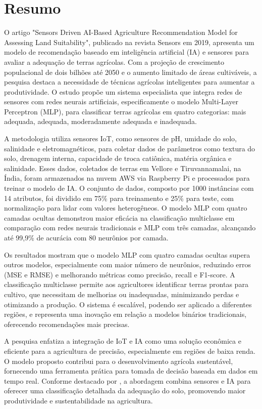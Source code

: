 \documentclass[a4paper,12pt]{article}
\begin{document}
\clearpage
\section{Resumo}
\begin{spacing}{1.5}

O artigo "Sensors Driven AI-Based Agriculture Recommendation Model for Assessing Land Suitability", publicado na revista Sensors em 2019, apresenta um modelo de recomendação baseado em inteligência artificial (IA) e sensores para avaliar a adequação de terras agrícolas. Com a projeção de crescimento populacional de dois bilhões até 2050 e o aumento limitado de áreas cultiváveis, a pesquisa destaca a necessidade de técnicas agrícolas inteligentes para aumentar a produtividade. O estudo propõe um sistema especialista que integra redes de sensores com redes neurais artificiais, especificamente o modelo Multi-Layer Perceptron (MLP), para classificar terras agrícolas em quatro categorias: mais adequada, adequada, moderadamente adequada e inadequada.

A metodologia utiliza sensores IoT, como sensores de pH, umidade do solo, salinidade e eletromagnéticos, para coletar dados de parâmetros como textura do solo, drenagem interna, capacidade de troca catiônica, matéria orgânica e salinidade. Esses dados, coletados de terras em Vellore e Tiruvannamalai, na Índia, foram armazenados na nuvem AWS via Raspberry Pi e processados para treinar o modelo de IA. O conjunto de dados, composto por 1000 instâncias com 14 atributos, foi dividido em 75\% para treinamento e 25\% para teste, com normalização para lidar com valores heterogêneos. O modelo MLP com quatro camadas ocultas demonstrou maior eficácia na classificação multiclasse em comparação com redes neurais tradicionais e MLP com três camadas, alcançando até 99,9\% de acurácia com 80 neurônios por camada.

Os resultados mostram que o modelo MLP com quatro camadas ocultas supera outros modelos, especialmente com maior número de neurônios, reduzindo erros (MSE e RMSE) e melhorando métricas como precisão, recall e F1-score. A classificação multiclasse permite aos agricultores identificar terras prontas para cultivo, que necessitam de melhorias ou inadequadas, minimizando perdas e otimizando a produção. O sistema é escalável, podendo ser aplicado a diferentes regiões, e representa uma inovação em relação a modelos binários tradicionais, oferecendo recomendações mais precisas.

A pesquisa enfatiza a integração de IoT e IA como uma solução econômica e eficiente para a agricultura de precisão, especialmente em regiões de baixa renda. O modelo proposto contribui para o desenvolvimento agrícola sustentável, fornecendo uma ferramenta prática para tomada de decisão baseada em dados em tempo real. Conforme destacado por \cite{Vincent2019}, a abordagem combina sensores e IA para oferecer uma classificação detalhada da adequação do solo, promovendo maior produtividade e sustentabilidade na agricultura.



\end{spacing}

\clearpage



\end{document}
